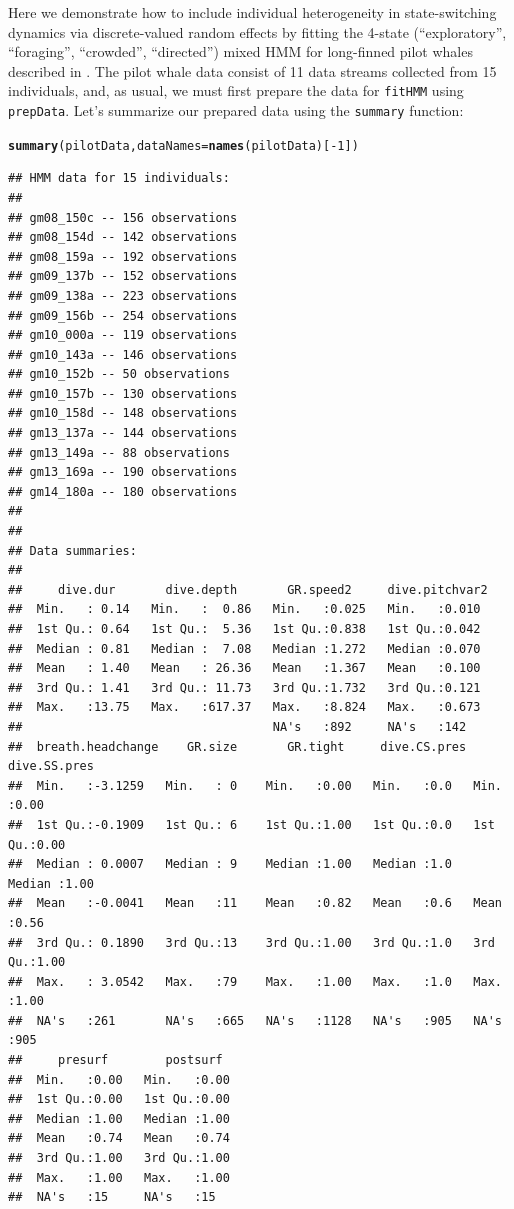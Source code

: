\documentclass[12pt]{article}\usepackage[]{graphicx}\usepackage[]{xcolor}
\makeatletter
\newcommand{\hlnum}[1]{\textcolor[rgb]{0.686,0.059,0.569}{#1}}%
\newcommand{\hlopt}[1]{\textcolor[rgb]{0,0,0}{#1}}%
\newcommand{\hldef}[1]{\textcolor[rgb]{0.345,0.345,0.345}{#1}}%
\newcommand{\hlkwc}[1]{\textcolor[rgb]{0.333,0.667,0.333}{#1}}%
\newcommand{\hlkwd}[1]{\textcolor[rgb]{0.737,0.353,0.396}{\textbf{#1}}}%
\newenvironment{kframe}{%
 \def\at@end@of@kframe{}%
 \ifinner\ifhmode%
  \def\at@end@of@kframe{\end{minipage}}%
  \begin{minipage}{\columnwidth}%
 \fi\fi%
 \def\FrameCommand##1{\hskip\@totalleftmargin \hskip-\fboxsep
 \colorbox{shadecolor}{##1}\hskip-\fboxsep
     \hskip-\linewidth \hskip-\@totalleftmargin \hskip\columnwidth}%
 \MakeFramed {\advance\hsize-\width
   \@totalleftmargin\z@ \linewidth\hsize
   \@setminipage}}%
 {\par\unskip\endMakeFramed%
 \at@end@of@kframe}
\newenvironment{knitrout}{}{} %
\makeatother
\begin{document}
Here we demonstrate how to include individual heterogeneity in state-switching dynamics via discrete-valued random effects by fitting the 4-state (``exploratory'', ``foraging'', ``crowded'', ``directed'') mixed HMM for long-finned pilot whales described in \cite{IsojunnoEtAl2017}.  The pilot whale data consist of 11 data streams collected from 15 individuals, and, as usual, we must first prepare the data for \verb|fitHMM| using \verb|prepData|. Let's summarize our prepared data using the \verb|summary| function:
\begin{knitrout}
\color{fgcolor}\begin{kframe}
\begin{alltt}
\hlkwd{summary}\hldef{(pilotData,} \hlkwc{dataNames}\hldef{=}\hlkwd{names}\hldef{(pilotData)[}\hlopt{-}\hlnum{1}\hldef{])}
\end{alltt}
\begin{verbatim}
## HMM data for 15 individuals:
## 
## gm08_150c -- 156 observations
## gm08_154d -- 142 observations
## gm08_159a -- 192 observations
## gm09_137b -- 152 observations
## gm09_138a -- 223 observations
## gm09_156b -- 254 observations
## gm10_000a -- 119 observations
## gm10_143a -- 146 observations
## gm10_152b -- 50 observations
## gm10_157b -- 130 observations
## gm10_158d -- 148 observations
## gm13_137a -- 144 observations
## gm13_149a -- 88 observations
## gm13_169a -- 190 observations
## gm14_180a -- 180 observations
## 
## 
## Data summaries:
## 
##     dive.dur       dive.depth       GR.speed2     dive.pitchvar2 
##  Min.   : 0.14   Min.   :  0.86   Min.   :0.025   Min.   :0.010  
##  1st Qu.: 0.64   1st Qu.:  5.36   1st Qu.:0.838   1st Qu.:0.042  
##  Median : 0.81   Median :  7.08   Median :1.272   Median :0.070  
##  Mean   : 1.40   Mean   : 26.36   Mean   :1.367   Mean   :0.100  
##  3rd Qu.: 1.41   3rd Qu.: 11.73   3rd Qu.:1.732   3rd Qu.:0.121  
##  Max.   :13.75   Max.   :617.37   Max.   :8.824   Max.   :0.673  
##                                   NA's   :892     NA's   :142    
##  breath.headchange    GR.size       GR.tight     dive.CS.pres  dive.SS.pres 
##  Min.   :-3.1259   Min.   : 0    Min.   :0.00   Min.   :0.0   Min.   :0.00  
##  1st Qu.:-0.1909   1st Qu.: 6    1st Qu.:1.00   1st Qu.:0.0   1st Qu.:0.00  
##  Median : 0.0007   Median : 9    Median :1.00   Median :1.0   Median :1.00  
##  Mean   :-0.0041   Mean   :11    Mean   :0.82   Mean   :0.6   Mean   :0.56  
##  3rd Qu.: 0.1890   3rd Qu.:13    3rd Qu.:1.00   3rd Qu.:1.0   3rd Qu.:1.00  
##  Max.   : 3.0542   Max.   :79    Max.   :1.00   Max.   :1.0   Max.   :1.00  
##  NA's   :261       NA's   :665   NA's   :1128   NA's   :905   NA's   :905   
##     presurf        postsurf   
##  Min.   :0.00   Min.   :0.00  
##  1st Qu.:0.00   1st Qu.:0.00  
##  Median :1.00   Median :1.00  
##  Mean   :0.74   Mean   :0.74  
##  3rd Qu.:1.00   3rd Qu.:1.00  
##  Max.   :1.00   Max.   :1.00  
##  NA's   :15     NA's   :15
\end{verbatim}
\end{kframe}
\end{knitrout}
\end{document}
